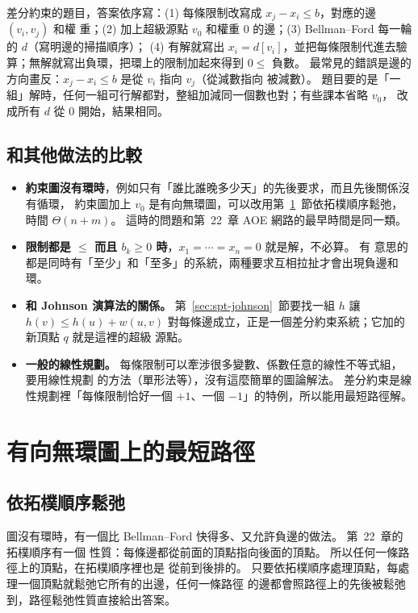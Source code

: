 \begin{examnote}
差分約束的題目，答案依序寫：(1) 每條限制改寫成 $x_j - x_i \le b$，對應的邊 $(v_i, v_j)$ 和權
重；(2) 加上超級源點 $v_0$ 和權重 $0$ 的邊；(3) Bellman--Ford 每一輪的 $d$（寫明邊的掃描順序）；
(4) 有解就寫出 $x_i = d[v_i]$，並把每條限制代進去驗算；無解就寫出負環，把環上的限制加起來得到
$0 \le$ 負數。 最常見的錯誤是邊的方向畫反：$x_j - x_i \le b$ 是從 $v_i$ 指向 $v_j$（從減數指向
被減數）。 題目要的是「一組」解時，任何一組可行解都對，整組加減同一個數也對；有些課本省略 $v_0$，
改成所有 $d$ 從 $0$ 開始，結果相同。
\end{examnote}

\subsection{和其他做法的比較}

\begin{itemize}
\item \textbf{約束圖沒有環時}，例如只有「誰比誰晚多少天」的先後要求，而且先後關係沒有循環，
約束圖加上 $v_0$ 是有向無環圖，可以改用第~\ref{sec:spt-dag}~節依拓樸順序鬆弛，時間
$\Theta(n + m)$。 這時的問題和第~22~章 AOE 網路的最早時間是同一類。
\item \textbf{限制都是 $\le$ 而且 $b_k \ge 0$ 時}，$x_1 = \cdots = x_n = 0$ 就是解，不必算。 有
意思的都是同時有「至少」和「至多」的系統，兩種要求互相拉扯才會出現負邊和環。
\item \textbf{和 Johnson 演算法的關係。} 第~\ref{sec:spt-johnson}~節要找一組 $h$ 讓
$h(v) \le h(u) + w(u, v)$ 對每條邊成立，正是一個差分約束系統；它加的新頂點 $q$ 就是這裡的超級
源點。
\item \textbf{一般的線性規劃。} 每條限制可以牽涉很多變數、係數任意的線性不等式組，要用線性規劃
的方法（單形法等），沒有這麼簡單的圖論解法。 差分約束是線性規劃裡「每條限制恰好一個 $+1$、一個
$-1$」的特例，所以能用最短路徑解。
\end{itemize}

\section{有向無環圖上的最短路徑}
\label{sec:spt-dag}

\subsection{依拓樸順序鬆弛}

圖沒有環時，有一個比 Bellman--Ford 快得多、又允許負邊的做法。 第~22~章的拓樸順序有一個
性質：每條邊都從前面的頂點指向後面的頂點。 所以任何一條路徑上的頂點，在拓樸順序裡也是
從前到後排的。 只要依拓樸順序處理頂點，每處理一個頂點就鬆弛它所有的出邊，任何一條路徑
的邊都會照路徑上的先後被鬆弛到，路徑鬆弛性質直接給出答案。

